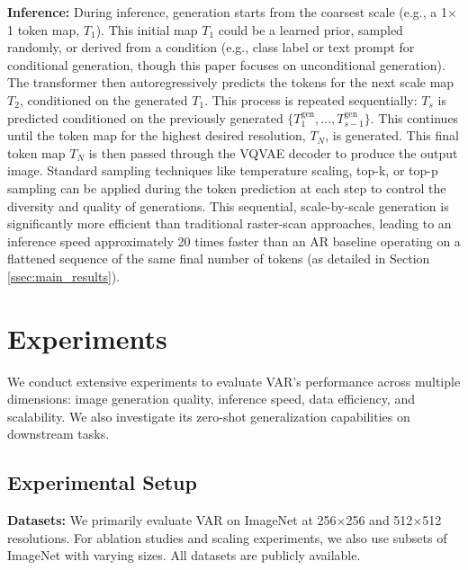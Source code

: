 \documentclass{article}
\begin{document}
\textbf{Inference:} During inference, generation starts from the coarsest scale (e.g., a 1$\times$1 token map, $T_1$). This initial map $T_1$ could be a learned prior, sampled randomly, or derived from a condition (e.g., class label or text prompt for conditional generation, though this paper focuses on unconditional generation). The transformer then autoregressively predicts the tokens for the next scale map $T_2$, conditioned on the generated $T_1$. This process is repeated sequentially: $T_s$ is predicted conditioned on the previously generated $\{T_1^{\text{gen}}, \ldots, T_{s-1}^{\text{gen}}\}$. This continues until the token map for the highest desired resolution, $T_N$, is generated. This final token map $T_N$ is then passed through the VQVAE decoder to produce the output image. Standard sampling techniques like temperature scaling, top-k, or top-p sampling can be applied during the token prediction at each step to control the diversity and quality of generations. This sequential, scale-by-scale generation is significantly more efficient than traditional raster-scan approaches, leading to an inference speed approximately 20 times faster than an AR baseline operating on a flattened sequence of the same final number of tokens (as detailed in Section \ref{ssec:main_results}).

\section{Experiments}
\label{sec:experiments}

We conduct extensive experiments to evaluate VAR's performance across multiple dimensions: image generation quality, inference speed, data efficiency, and scalability. We also investigate its zero-shot generalization capabilities on downstream tasks.

\subsection{Experimental Setup}
\label{ssec:setup}

\textbf{Datasets:} We primarily evaluate VAR on ImageNet \cite{deng2009imagenet} at 256$\times$256 and 512$\times$512 resolutions. For ablation studies and scaling experiments, we also use subsets of ImageNet with varying sizes. All datasets are publicly available.
\end{document}
